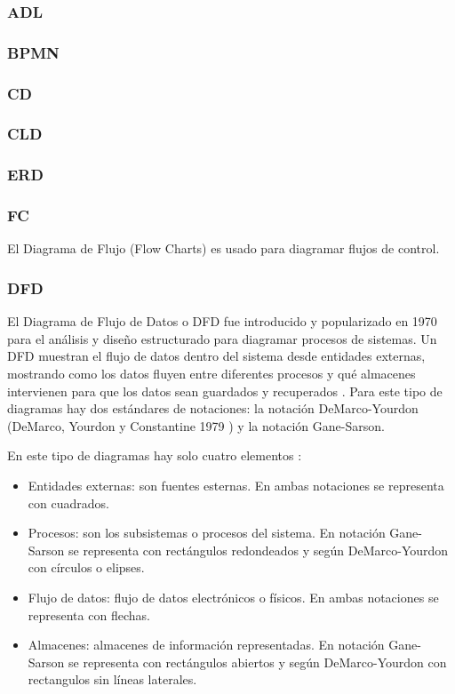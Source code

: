 \subsubsection{ADL}
\subsubsection{BPMN}
\subsubsection{CD}
\subsubsection{CLD}
\subsubsection{ERD}
\subsubsection{FC}
El Diagrama de Flujo (Flow Charts) es usado para diagramar flujos de control.

\subsubsection{DFD}
El Diagrama de Flujo de Datos o DFD fue introducido y popularizado en 1970 para el análisis y diseño estructurado \cite{Gane-Sarson-1979} para diagramar procesos de sistemas. Un DFD muestran el flujo de datos dentro del sistema desde entidades externas, mostrando como los datos fluyen entre diferentes procesos y qué almacenes intervienen para que los datos sean guardados y recuperados \cite{Scott-Ambler-2004}. 
Para este tipo de diagramas hay dos estándares de notaciones: la notación DeMarco-Yourdon (DeMarco, Yourdon y Constantine 1979 \cite{Dixit-2007}) y la notación Gane-Sarson.

En este tipo de diagramas hay solo cuatro elementos \cite{Dixit-2007}:
\begin{itemize}
\item Entidades externas: son fuentes esternas. En ambas notaciones se representa con cuadrados.
\item Procesos: son los subsistemas o procesos del sistema. En notación Gane-Sarson se representa con rectángulos redondeados y según DeMarco-Yourdon con círculos o elipses.  
\item Flujo de datos: flujo de datos electrónicos o físicos. En ambas notaciones se representa con flechas.
\item Almacenes: almacenes de información representadas. En notación Gane-Sarson se representa con rectángulos abiertos y según DeMarco-Yourdon con rectangulos sin líneas laterales.
\end{itemize}

